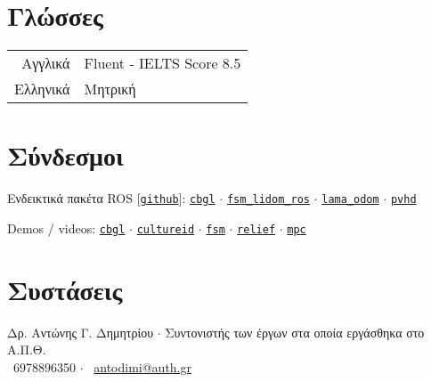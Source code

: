 \documentclass[a4paper,10pt,twoside]{article}
\begin{document}

\section{Γλώσσες}

\begin{tabular}{rp{12cm}}
Αγγλικά & Fluent - IELTS Score 8.5\\
Ελληνικά & Μητρική
\end{tabular}

\section{Σύνδεσμοι}

Ενδεικτικά πακέτα ROS [\href{https://github.com/li9i}{\texttt{github}}]:
\href{https://github.com/li9i/cbgl}{\texttt{cbgl}} $\cdot$
\href{https://github.com/li9i/fsm\_lidom\_ros}{\texttt{fsm\_lidom\_ros}} $\cdot$
\href{https://github.com/li9i/lama\_odom}{\texttt{lama\_odom}} $\cdot$
\href{https://github.com/li9i/pandora\_vision\_2014/tree/hydro-devel/pandora\_vision\_hole\_detector}{\texttt{pvhd}}

Demos / videos: \href{https://www.youtube.com/watch?v=xaDKjI0WkDc}{\texttt{cbgl}} $\cdot$ \href{https://cultureid.web.auth.gr/?page\_id=200&lang=en}{\texttt{cultureid}} $\cdot$ \href{https://www.youtube.com/watch?v=hB4qsHCEXGI}{\texttt{fsm}} $\cdot$ \href{https://relief.web.auth.gr/}{\texttt{relief}} $\cdot$ \href{https://www.youtube.com/watch?v=937OZez1iN8}{\texttt{mpc}}
\\

\section{Συστάσεις}
\noindent Δρ. Αντώνης Γ. Δημητρίου $\cdot$ Συντονιστής των έργων στα οποία εργάσθηκα στο Α.Π.Θ. \\
\faPhone \ 6978896350 $\cdot$ \faEnvelopeO \ \href{mailto:antodimi@auth.gr}{antodimi@auth.gr} \\
\end{document}
